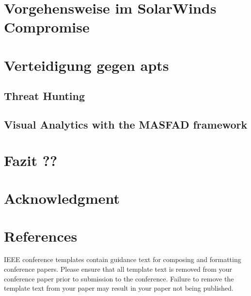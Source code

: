 \documentclass[conference]{IEEEtran}
\begin{document}
\section{Vorgehensweise im SolarWinds Compromise}

\section{Verteidigung gegen \aclp{apt}}
\subsection{Threat Hunting}
\subsection{Visual Analytics with the MASFAD framework}
\section{Fazit ??}

\section*{Acknowledgment}

\section*{References}

\balance





\vspace{12pt}
\color{red}
IEEE conference templates contain guidance text for composing and formatting conference papers. Please ensure that all template text is removed from your conference paper prior to submission to the conference. Failure to remove the template text from your paper may result in your paper not being published.
\end{document}
